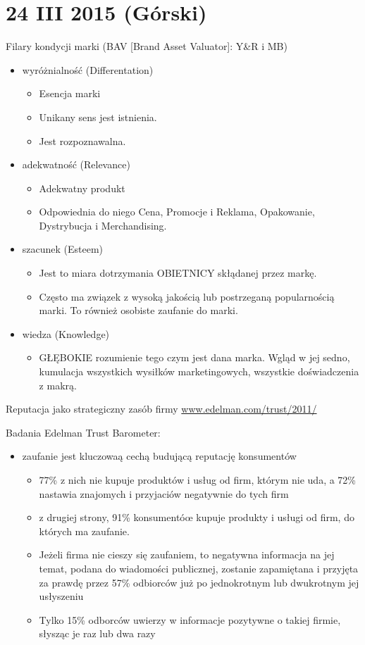 \documentclass[a4paper,10pt]{report}
\begin{document}
\section{24 III 2015 (Górski)}

Filary kondycji marki (BAV [Brand Asset Valuator]: Y\&R i MB)

\begin{itemize}
	\item wyróżnialność (Differentation)
	\begin{itemize}
		\item Esencja marki
		\item Unikany sens jest istnienia.
		\item Jest rozpoznawalna.
	\end{itemize}
	\item adekwatność (Relevance)
	\begin{itemize}
		\item Adekwatny produkt
		\item Odpowiednia do niego Cena, Promocje i Reklama, Opakowanie, Dystrybucja i Merchandising.
	\end{itemize}
	\item szacunek (Esteem)
	\begin{itemize}
		\item Jest to miara dotrzymania OBIETNICY skłądanej przez markę.
		\item Często ma związek z wysoką jakością lub postrzeganą popularnością marki. To również osobiste zaufanie do marki.
	\end{itemize}
	\item wiedza (Knowledge)
	\begin{itemize}
		\item GŁĘBOKIE rozumienie tego czym jest dana marka. Wgląd w jej sedno, kumulacja wszystkich wysiłków marketingowych, wszystkie doświadczenia z makrą.
	\end{itemize}
\end{itemize}

Reputacja jako strategiczny zasób firmy
\url{www.edelman.com/trust/2011/}

Badania Edelman Trust Barometer:
\begin{itemize}
	\item zaufanie jest kluczowaą cechą budującą reputację konsumentów
	\begin{itemize}
		\item 77\% z nich nie kupuje produktów i usług od firm, którym nie uda, a 72\% nastawia znajomych i przyjaciów negatywnie do tych firm
		\item z drugiej strony, 91\% konsumentóœ kupuje produkty i usługi od firm, do których ma zaufanie.
		\item Jeżeli firma nie cieszy się zaufaniem, to negatywna informacja na jej temat, podana do wiadomości publicznej, zostanie zapamiętana i przyjęta za prawdę przez 57\% odbiorców już po jednokrotnym lub dwukrotnym jej usłyszeniu
		\item Tylko 15\% odborców uwierzy w informacje pozytywne o takiej firmie, słysząc je raz lub dwa razy
	\end{itemize}
\end{itemize}
\end{document}
